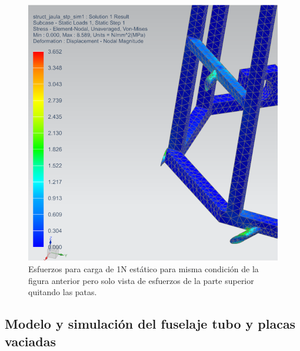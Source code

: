 \begin{figure}[htb]
    \centering
    \includegraphics[width=\linewidth]{fig/fea/jaula2.png}
    \caption{Esfuerzos para carga de 1N estático para misma condición de la figura anterior pero solo vista de esfuerzos de la parte superior quitando las patas.}
    \label{fig:fea/jaula2}
\end{figure}

\null\newpage
\clearpage

\subsection{Modelo y simulación del fuselaje tubo y placas vaciadas}

